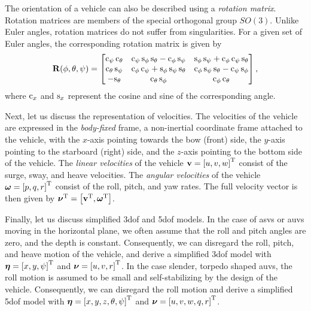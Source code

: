 The orientation of a vehicle can also be described using a \emph{rotation matrix}.
Rotation matrices are members of the special orthogonal group $SO(3)$.
Unlike Euler angles, rotation matrices do not suffer from singularities.
For a given set of Euler angles, the corresponding rotation matrix is given by \cite{fossen_handbook_2011}
\begin{equation}
    \mathbf{R}(\phi, \theta, \psi)
    =
    \begin{bmatrix} 
        {\rm c}_{\psi}\,{\rm c}_{\theta} & {\rm c}_{\psi}\,{\rm s}_{\phi}\,{\rm s}_{\theta}-{\rm c}_{\phi}\,{\rm s}_{\psi} & {\rm s}_{\phi}\,{\rm s}_{\psi}+{\rm c}_{\phi}\,{\rm c}_{\psi}\,{\rm s}_{\theta}\\ {\rm c}_{\theta}\,{\rm s}_{\psi} & {\rm c}_{\phi}\,{\rm c}_{\psi}+{\rm s}_{\phi}\,{\rm s}_{\psi}\,{\rm s}_{\theta} & {\rm c}_{\phi}\,{\rm s}_{\psi}\,{\rm s}_{\theta}-{\rm c}_{\psi}\,{\rm s}_{\phi}\\ -{\rm s}_{\theta} & {\rm c}_{\theta}\,{\rm s}_{\phi} & {\rm c}_{\phi}\,{\rm c}_{\theta} 
    \end{bmatrix},
    \label{eq:background_Rzyx}
\end{equation}
where ${\rm c}_x$ and ${\rm s}_x$ represent the cosine and sine of the corresponding angle.

Next, let us discuss the representation of velocities.
The velocities of the vehicle are expressed in the \emph{body-fixed} frame, a non-inertial coordinate frame attached to the vehicle, with the $x$-axis pointing towards the bow (front) side, the $y$-axis pointing to the starboard (right) side, and the $z$-axis pointing to the bottom side of the vehicle.
The \emph{linear velocities} of the vehicle $\mathbf{v} = \left[u, v, w\right]^{\mathrm{T}}$ consist of the surge, sway, and heave velocities.
The \emph{angular velocities} of the vehicle $\bm{\omega} = \left[p, q, r\right]^{\mathrm{T}}$ consist of the roll, pitch, and yaw rates.
The full velocity vector is then given by $\bm{\nu}^{\mathrm{T}} = \left[\mathbf{v}^{\mathrm{T}}, \bm{\omega}^{\mathrm{T}}\right]$.

Finally, let us discuss simplified 3\gls{dof} and 5\gls{dof} models.
In the case of \glspl{asv} or \glspl{auv} moving in the horizontal plane, we often assume that the roll and pitch angles are zero, and the depth is constant.
Consequently, we can disregard the roll, pitch, and heave motion of the vehicle, and derive a simplified 3\gls{dof} model with $\bm{\eta} = \left[x, y, \psi\right]^{\mathrm{T}}$ and $\bm{\nu} = \left[u, v, r\right]^{\mathrm{T}}$.
In the case slender, torpedo shaped \glspl{auv}, the roll motion is assumed to be small and self-stabilizing by the design of the vehicle.
Consequently, we can disregard the roll motion and derive a simplified 5\gls{dof} model with $\bm{\eta} = \left[x, y, z, \theta, \psi\right]^{\mathrm{T}}$ and $\bm{\nu} = \left[u, v, w, q, r\right]^{\mathrm{T}}$.

